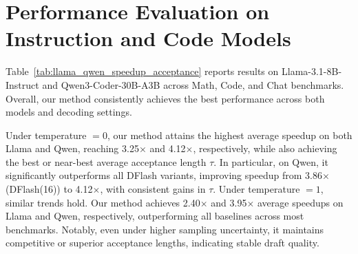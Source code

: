 \documentclass{llmxive}
\begin{document}




\section{Performance Evaluation on Instruction and Code Models}
\label{app:main}
Table~\ref{tab:llama_qwen_speedup_acceptance} reports results on Llama-3.1-8B-Instruct and Qwen3-Coder-30B-A3B across Math, Code, and Chat benchmarks. Overall, our method consistently achieves the best performance across both models and decoding settings.

Under temperature $=0$, our method attains the highest average speedup on both Llama and Qwen, reaching 3.25$\times$ and 4.12$\times$, respectively, while also achieving the best or near-best average acceptance length $\tau$. In particular, on Qwen, it significantly outperforms all DFlash variants, improving speedup from 3.86$\times$ (DFlash(16)) to 4.12$\times$, with consistent gains in $\tau$. Under temperature $=1$, similar trends hold. Our method achieves 2.40$\times$ and 3.95$\times$ average speedups on Llama and Qwen, respectively, outperforming all baselines across most benchmarks. Notably, even under higher sampling uncertainty, it maintains competitive or superior acceptance lengths, indicating stable draft quality.
\end{document}
